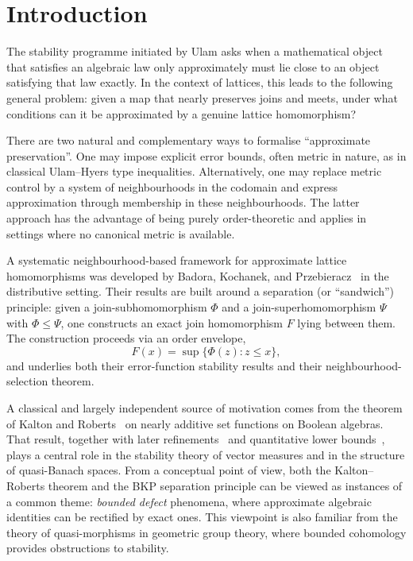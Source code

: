 \documentclass[11pt]{amsart}
\theoremstyle{definition}
\begin{document}
\maketitle

\section{Introduction}

The stability programme initiated by Ulam asks when a mathematical object that satisfies
an algebraic law only approximately must lie close to an object satisfying that law exactly.
In the context of lattices, this leads to the following general problem:
given a map that nearly preserves joins and meets, under what conditions can it be
approximated by a genuine lattice homomorphism?

There are two natural and complementary ways to formalise ``approximate preservation''.
One may impose explicit error bounds, often metric in nature, as in classical Ulam--Hyers
type inequalities.
Alternatively, one may replace metric control by a system of neighbourhoods in the codomain
and express approximation through membership in these neighbourhoods.
The latter approach has the advantage of being purely order-theoretic and applies in settings
where no canonical metric is available.

A systematic neighbourhood-based framework for approximate lattice homomorphisms was
developed by Badora, Kochanek, and Przebieracz~\cite{BKP} in the distributive setting.
Their results are built around a separation (or ``sandwich'') principle:
given a join-subhomomorphism $\Phi$ and a join-superhomomorphism $\Psi$ with $\Phi\le \Psi$,
one constructs an exact join homomorphism $F$ lying between them.
The construction proceeds via an order envelope,
\[
F(x)=\sup\{\Phi(z): z\le x\},
\]
and underlies both their error-function stability results and their neighbourhood-selection
theorem.

A classical and largely independent source of motivation comes from the theorem of
Kalton and Roberts~\cite{KR} on nearly additive set functions on Boolean algebras.
That result, together with later refinements~\cite{BPR} and quantitative lower bounds~\cite{GGK},
plays a central role in the stability theory of vector measures and in the structure of
quasi-Banach spaces.
From a conceptual point of view, both the Kalton--Roberts theorem and the BKP separation
principle can be viewed as instances of a common theme: \emph{bounded defect} phenomena,
where approximate algebraic identities can be rectified by exact ones.
This viewpoint is also familiar from the theory of quasi-morphisms in geometric group theory,
where bounded cohomology provides obstructions to stability.
\end{document}
